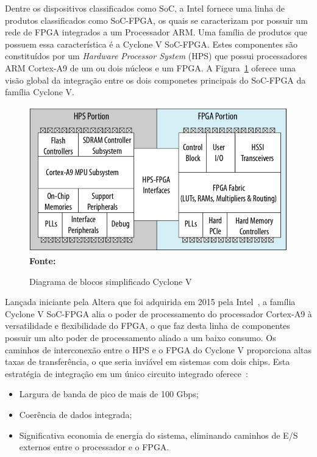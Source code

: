 
Dentre os dispositivos classificados como SoC, a Intel fornece uma linha de produtos classificados como SoC-FPGA, os quais se caracterizam por possuir um rede de FPGA integrados a um Processador ARM\@. Uma família de produtos que possuem essa característica é a Cyclone V SoC-FPGA\@. Estes componentes são constituídos por um \textit{Hardware Processor System} (HPS) que possui processadores ARM Cortex-A9 de um ou dois núcleos e um FPGA\@. A Figura~\ref{fig:socfpga} oferece uma visão global da integração entre os dois componetes principais do SoC-FPGA da família Cyclone V. 

\begin{figure}[ht]
	\caption{Diagrama de blocos simplificado Cyclone V}
	\begin{center}
		\includegraphics[scale=0.46]{imagens/socfpga.png}\\
		{\small \textbf{Fonte:} }
    \end{center}\label{fig:socfpga}
\end{figure}

Lançada iniciante pela Altera que foi adquirida em 2015 pela Intel~\cite{intelbuyaltera}, a família Cyclone V SoC-FPGA alia o poder de processamento do processador Cortex-A9 à versatilidade e flexibilidade do FPGA, o que faz desta linha de componentes possuir um alto poder de processamento aliado a um baixo consumo. Os caminhos de interconexão entre o HPS e o FPGA do Cyclone V proporciona altas taxas de transferência, o que seria inviável em sistemas com dois chips. Esta estratégia de integração em um único circuito integrado oferece~\cite{CycloneV}:

\begin{itemize}
    \item Largura de banda de pico de mais de 100 Gbps;
    \item Coerência de dados integrada;
    \item Significativa economia de energia do sistema, eliminando caminhos de E/S externos entre o processador e o FPGA\@.
\end{itemize}

